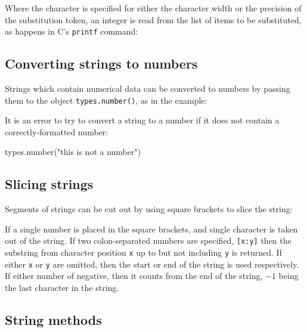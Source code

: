 Where the character {\tt *} is specified for either the character width or the
precision of the substitution token, an integer is read from the list of items
to be substituted, as happens in C's {\tt printf} command:

\vspace{3mm}

\vspace{3mm}

\subsection{Converting strings to numbers}

Strings which contain numerical data can be converted to numbers by passing
them to the object {\tt types.number()}, as in the example:

\vspace{3mm}

\vspace{3mm}

\noindent It is an error to try to convert a string to a number if it does not contain a correctly-formatted number:

\begin{dontdo}
types.number("this is not a number")
\end{dontdo}

\subsection{Slicing strings}

Segments of strings can be cut out by using square brackets to slice the string:

\vspace{3mm}

\vspace{3mm}

\noindent If a single number is placed in the square brackets, and single
character is taken out of the string. If two colon-separated numbers are
specified, {\tt [x:y]} then the substring from character position {\tt x} up to
but not including {\tt y} is returned. If either {\tt x} or {\tt y} are
omitted, then the start or end of the string is used respectively. If either
number of negative, then it counts from the end of the string, $-1$ being the
last character in the string.

\subsection{String methods}

